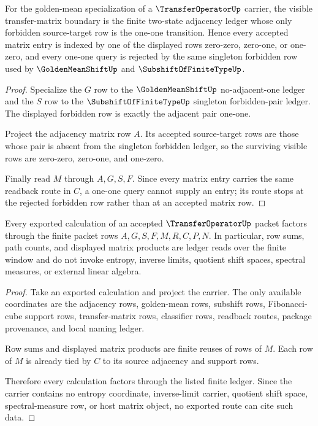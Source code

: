 \begin{theorem}
\label{thm:transfer-operator-golden-mean-matrix-boundary}
For the golden-mean specialization of a $\TransferOperatorUp$ carrier, the visible transfer-matrix boundary is the finite two-state adjacency ledger whose only forbidden source-target row is the one-one transition. Hence every accepted matrix entry is indexed by one of the displayed rows zero-zero, zero-one, or one-zero, and every one-one query is rejected by the same singleton forbidden row used by $\GoldenMeanShiftUp$ and $\SubshiftOfFiniteTypeUp$.
\end{theorem}
\begin{proof}
Specialize the $G$ row to the $\GoldenMeanShiftUp$ no-adjacent-one ledger and the $S$ row to the $\SubshiftOfFiniteTypeUp$ singleton forbidden-pair ledger. The displayed forbidden row is exactly the adjacent pair one-one.

Project the adjacency matrix row $A$. Its accepted source-target rows are those whose pair is absent from the singleton forbidden ledger, so the surviving visible rows are zero-zero, zero-one, and one-zero.

Finally read $M$ through $A,G,S,F$. Since every matrix entry carries the same readback route in $C$, a one-one query cannot supply an entry; its route stops at the rejected forbidden row rather than at an accepted matrix row.
\end{proof}

\begin{theorem}
\label{thm:transfer-operator-finite-window-ledger}
Every exported calculation of an accepted $\TransferOperatorUp$ packet factors through the finite packet rows $A,G,S,F,M,R,C,P,N$. In particular, row sums, path counts, and displayed matrix products are ledger reads over the finite window and do not invoke entropy, inverse limits, quotient shift spaces, spectral measures, or external linear algebra.
\end{theorem}
\begin{proof}
Take an exported calculation and project the carrier. The only available coordinates are the adjacency rows, golden-mean rows, subshift rows, Fibonacci-cube support rows, transfer-matrix rows, classifier rows, readback routes, package provenance, and local naming ledger.

Row sums and displayed matrix products are finite reuses of rows of $M$. Each row of $M$ is already tied by $C$ to its source adjacency and support rows.

Therefore every calculation factors through the listed finite ledger. Since the carrier contains no entropy coordinate, inverse-limit carrier, quotient shift space, spectral-measure row, or host matrix object, no exported route can cite such data.
\end{proof}

